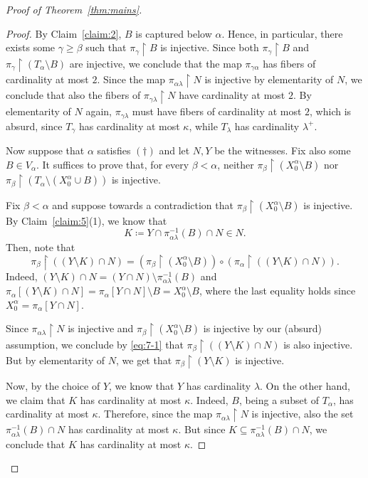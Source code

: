 \documentclass[]{amsart}
\theoremstyle{definition}
\theoremstyle{remark}
\begin{document}
\begin{proof}[Proof of Theorem~\ref{thm:mains}]
\begin{proof}
By Claim~\ref{claim:2}, $B$ is captured below $\alpha$. Hence, in particular, there exists some $\gamma \ge \beta$ such that $\pi_\gamma \upharpoonright B$ is injective. Since both $\pi_\gamma \upharpoonright B$ and $\pi_\gamma \upharpoonright (T_\alpha \setminus B)$ are injective, we conclude that the map $\pi_{\gamma \alpha}$ has fibers of cardinality at most $2$. Since the map $\pi_{\alpha \lambda} \upharpoonright N$ is injective by elementarity of $N$, we conclude that also the fibers of $\pi_{\gamma \lambda} \upharpoonright N$ have cardinality at most $2$. By elementarity of $N$ again, $\pi_{\gamma \lambda}$ must have fibers of cardinality at most $2$, which is absurd, since $T_\gamma$ has cardinality at most $\kappa$, while $T_\lambda$ has cardinality $\lambda^+$.


Now suppose that $\alpha$ satisfies $(\dagger)$ and let $N, Y$ be the witnesses. Fix also some $B \in V_\alpha$. It suffices to prove that, for every $\beta < \alpha$, neither $\pi_{\beta} \upharpoonright (X^\alpha_0 \setminus B)$ nor  $\pi_{\beta} \upharpoonright (T_\alpha \setminus (X^\alpha_0 \cup  B))$ is injective.

Fix $\beta < \alpha$ and suppose towards a contradiction that $\pi_{\beta} \upharpoonright (X^\alpha_0 \setminus B)$ is injective. By Claim~\ref{claim:5}(1), we know that 
\[
K \coloneqq Y \cap \pi_{\alpha \lambda}^{-1}(B) \cap N \in N.
\]
Then, note that
\begin{equation}\label{eq:7-1}
\pi_\beta \upharpoonright ((Y \setminus K) \cap N) = (\pi_\beta \upharpoonright (X^\alpha_0 \setminus B)) \circ (\pi_\alpha \upharpoonright ((Y \setminus K) \cap N)).
\end{equation}
Indeed, $(Y \setminus K) \cap N = (Y \cap N) \setminus \pi_{\alpha \lambda}^{-1}(B)$ and $\pi_\alpha[(Y \setminus K) \cap N] = \pi_\alpha[Y \cap N] \setminus B = X^\alpha_0 \setminus B$, where the last equality holds since $X^\alpha_0 = \pi_\alpha[Y \cap N]$.

Since $\pi_{\alpha \lambda} \upharpoonright N$ is injective and $\pi_{\beta} \upharpoonright (X^\alpha_0 \setminus B)$ is injective by our (absurd) assumption, we conclude by \eqref{eq:7-1} that $\pi_\beta \upharpoonright ((Y \setminus K) \cap N)$ is also injective. But by elementarity of $N$, we get that $\pi_\beta \upharpoonright (Y \setminus K)$ is injective. 

Now, by the choice of $Y$, we know that $Y$ has cardinality $\lambda$. On the other hand, we claim that $K$ has cardinality at most $\kappa$. Indeed, $B$, being a subset of $T_\alpha$, has cardinality at most $\kappa$. Therefore, since the map $\pi_{\alpha \lambda} \upharpoonright N$ is injective, also the set $\pi_{\alpha \lambda}^{-1}(B) \cap N$ has cardinality at most $\kappa$. But since $K \subseteq \pi_{\alpha \lambda}^{-1}(B) \cap N$, we conclude that $K$ has cardinality at most $\kappa$. 


\end{proof}
\end{proof}
\end{document}
